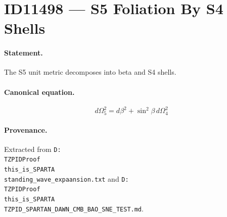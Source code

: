 \section*{ID11498 --- S5 Foliation By S4 Shells}

\paragraph{Statement.}
The S5 unit metric decomposes into beta and S4 shells.

\paragraph{Canonical equation.}
\[
d\Omega_5^2=d\beta^2+\sin^2\beta\,d\Omega_4^2
\]

\paragraph{Provenance.}
Extracted from \texttt{D:\\TZPIDProof\\this\_is\_SPARTA\\standing\_wave\_expaansion.txt} and \texttt{D:\\TZPIDProof\\this\_is\_SPARTA\\TZPID\_SPARTAN\_DAWN\_CMB\_BAO\_SNE\_TEST.md}.
